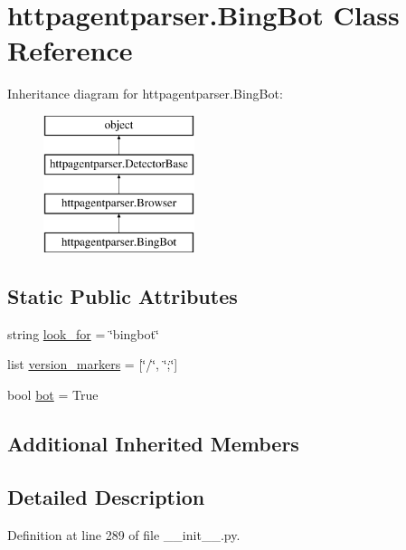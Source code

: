\hypertarget{classhttpagentparser_1_1_bing_bot}{}\section{httpagentparser.\+Bing\+Bot Class Reference}
\label{classhttpagentparser_1_1_bing_bot}
Inheritance diagram for httpagentparser.\+Bing\+Bot\+:\begin{figure}[H]
\begin{center}
\leavevmode
\includegraphics[height=4.000000cm]{classhttpagentparser_1_1_bing_bot}
\end{center}
\end{figure}
\subsection*{Static Public Attributes}
\begin{DoxyCompactItemize}
\item 
string \hyperlink{classhttpagentparser_1_1_bing_bot_ae90f6e9b017e905b4301e222ed4fd390}{look\+\_\+for} = \char`\"{}bingbot\char`\"{}
\item 
list \hyperlink{classhttpagentparser_1_1_bing_bot_a29f93d36e3786ff440fc9140f2965d96}{version\+\_\+markers} = \mbox{[}\char`\"{}/\char`\"{}, \char`\"{};\char`\"{}\mbox{]}
\item 
bool \hyperlink{classhttpagentparser_1_1_bing_bot_a7b177ba9fceb92b6f24f1f89031439fb}{bot} = True
\end{DoxyCompactItemize}
\subsection*{Additional Inherited Members}


\subsection{Detailed Description}


Definition at line 289 of file \+\_\+\+\_\+init\+\_\+\+\_\+.\+py.



